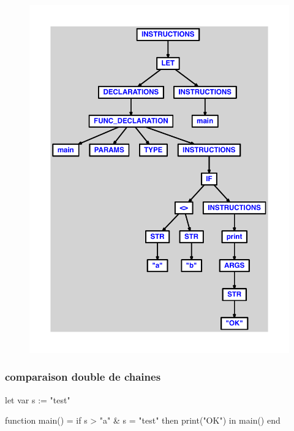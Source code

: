 \documentclass{article}
\begin{document}
\begin{figure}[H]\centering\includegraphics[max width=\textwidth]{ast/ast_180.pdf}\end{figure}\subsubsection{comparaison double de chaines}
\begin{verbatimtab}
let
	var s := "test"

	function main() =
		if s > "a" & s = "test" then print("OK")
in main() end
\end{verbatimtab}
\end{document}

